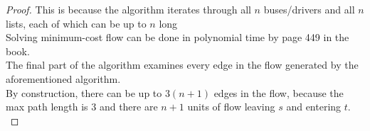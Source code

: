 \begin{problem}
\begin{proof}
        This is because the algorithm iterates through all $n$ buses/drivers and all $n$ lists, each of which can be up to $n$ long \\
        Solving minimum-cost flow can be done in polynomial time by page 449 in the book. \\
        The final part of the algorithm examines every edge in the flow generated by the aforementioned algorithm. \\
        By construction, there can be up to $3(n+1)$ edges in the flow, because the max path length is $3$ and there are $n+1$ units of flow leaving
        $s$ and entering $t$. \\
    \end{proof}
\end{problem}
